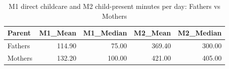 \begin{table}[ht]
\centering
\begin{tabular}{lrrrr}
  \toprule
Parent & M1\_Mean & M1\_Median & M2\_Mean & M2\_Median \\ 
  \midrule
Fathers & 114.90 & 75.00 & 369.40 & 300.00 \\ 
  Mothers & 132.20 & 100.00 & 421.00 & 405.00 \\ 
   \bottomrule
\end{tabular}
\caption{M1 direct childcare and M2 child-present minutes per day: Fathers vs Mothers} 
\label{tab:desc_m1m2_sex}
\end{table}
